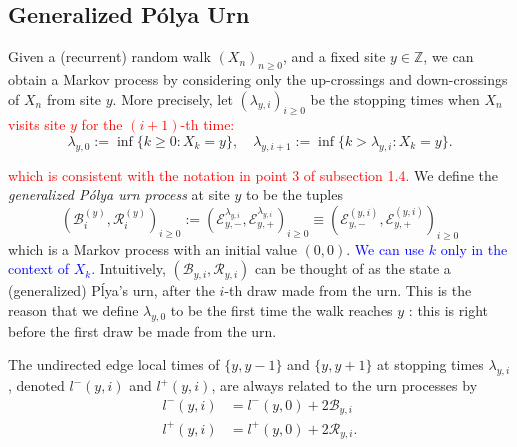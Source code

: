\documentclass[twoside,12pt,a4paper]{article}
\numberwithin{equation}{section}
\newcommand{\edt}[1]{\textcolor{red}{#1}} %
\newcommand{\comment}[1]{\textcolor{blue}{#1}}
\begin{document}
\subsection{Generalized P\'{o}lya  Urn}

	Given a (recurrent) random walk $(X_n)_{n\geq 0}$, and a fixed site $y\in \mathbb{Z}$, we can obtain a Markov process by considering only the up-crossings and down-crossings of $X_n$ from site $y$. More precisely, let $(\lambda_{y,i})_{i\geq 0}$ be the stopping times when $X_n$ \edt{visits site $y$ for the $\left( i+1 \right) $-th time:}
	\[
	 \lambda_{y,0} :=\inf\{ k\geq 0: X_k = y \} , \quad \lambda_{y,i+1} := \inf\{ k> \lambda_{y, i}: X_k = y \}.
	\] 
	
	\edt{which is consistent with the notation in point 3 of subsection 1.4. }
	We define the \textit{generalized P\'olya urn process} at site $y$ to be the tuples 
	\[
	\left(\mathcal{B}^{(y)}_{i},\mathcal{R}^{(y)}_{i} \right)_{i\ge 0}
	:=\left(\mathcal{E}^{\lambda_{y,i}}_{y,-}, \mathcal{E}^{\lambda_{y,i}}_{y,+}\right)_{i\geq 0} 
	\equiv  \left(\mathcal{E}^{(y,i)}_{y,-}, \mathcal{E}^{(y,i)}_{y,+}\right)_{i\geq 0}
	\] 
	which is a Markov process with an initial value $(0,0)$. \comment{We can use $k$ only in the context of $X_k$.} Intuitively, $\left(\mathcal{B}_{y,i},\mathcal{R}_{y,i} \right)$ can be thought of as the state a (generalized) P\'lya's urn, after the $i$-th draw made from the urn. This is the reason that we define $\lambda_{y, 0}$ to be the first time the walk reaches $y$ : this is right before the first draw be made from the urn. 

	The undirected edge local times of $\{y,y-1\}$ and $\{y,y+1\}$ at stopping times $\lambda_{y, i}$, denoted $l^-(y,i)$ and $l^+(y,i)$, are always related to the urn processes by
	\begin{align*}
		l^-(y,i) &= l^-(y,0) + 2 \mathcal{B}_{y,i} \\
		l^+(y,i) &= l^+(y,0) + 2 \mathcal{R}_{y, i}
	.\end{align*}
\end{document}
